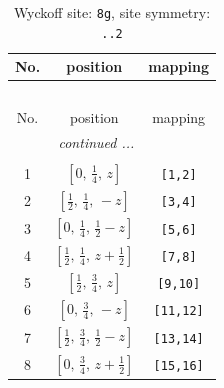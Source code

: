 \documentclass[fleqn,8pt]{jsarticle}
\begin{document}
\begin{longtable}{ccc}
\caption{Wyckoff site: {\tt 8g}, site symmetry: {\tt ..2}}
 \\
 \hline \hline
No. & position & mapping \\ \hline \endfirsthead

\multicolumn{2}{l}{\tablename\ \thetable{}} \\
 \hline \hline
No. & position & mapping \\ \hline \endhead

 \hline \hline
\multicolumn{2}{r}{\footnotesize\it continued ...} \\ \endfoot

 \hline \hline
\multicolumn{2}{r}{} \\ \endlastfoot

1 & $\left[ 0,\, \frac{1}{4},\, z \right]$ & {\tt [1,2]} \\ \hline
2 & $\left[ \frac{1}{2},\, \frac{1}{4},\, - z \right]$ & {\tt [3,4]} \\ \hline
3 & $\left[ 0,\, \frac{1}{4},\, \frac{1}{2} - z \right]$ & {\tt [5,6]} \\ \hline
4 & $\left[ \frac{1}{2},\, \frac{1}{4},\, z + \frac{1}{2} \right]$ & {\tt [7,8]} \\ \hline
5 & $\left[ \frac{1}{2},\, \frac{3}{4},\, z \right]$ & {\tt [9,10]} \\ \hline
6 & $\left[ 0,\, \frac{3}{4},\, - z \right]$ & {\tt [11,12]} \\ \hline
7 & $\left[ \frac{1}{2},\, \frac{3}{4},\, \frac{1}{2} - z \right]$ & {\tt [13,14]} \\ \hline
8 & $\left[ 0,\, \frac{3}{4},\, z + \frac{1}{2} \right]$ & {\tt [15,16]} \\
\end{longtable}
\renewcommand{\arraystretch}{1.2}
\end{document}
